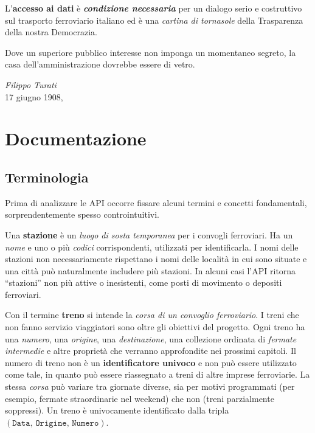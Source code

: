 \documentclass[12pt,italian]{report}
\begin{document}
L'\textbf{accesso ai dati} è \textit{\textbf{condizione necessaria}}
per un dialogo serio e costruttivo sul trasporto ferroviario italiano
ed è una \textit{cartina di tornasole} della Trasparenza della nostra
Democrazia.

\vfill

\epigraph{Dove un superiore pubblico interesse non imponga un
    momentaneo segreto, la casa dell'amministrazione dovrebbe essere
    di vetro.}{\textit{Filippo Turati}\\17 giugno 1908,~\cite{Turati}}


\printbibliography


\appendix

\chapter{Documentazione}
\label{documentazione}

\section{Terminologia}
\label{terminologia}

Prima di analizzare le API occorre fissare alcuni termini e concetti
fondamentali, sorprendentemente spesso controintuitivi.

Una \textbf{stazione} è un \textit{luogo di sosta temporanea} per i
convogli ferroviari.  Ha un \textit{nome} e uno o più \textit{codici}
corrispondenti, utilizzati per identificarla.  I nomi delle stazioni
non necessariamente rispettano i nomi delle località in cui sono
situate e una città può naturalmente includere più stazioni.  In
alcuni casi l'API ritorna ``stazioni'' non più attive o inesistenti,
come posti di movimento o depositi ferroviari.

Con il termine \textbf{treno} si intende la \textit{corsa di un
    convoglio ferroviario}.  I treni che non fanno servizio
viaggiatori sono oltre gli obiettivi del progetto.  Ogni treno ha una
\textit{numero}, una \textit{origine}, una \textit{destinazione}, una
collezione ordinata di \textit{fermate intermedie} e altre proprietà
che verranno approfondite nei prossimi capitoli.  Il numero di treno
non è un \textbf{identificatore univoco} e non può essere utilizzato
come tale, in quanto può essere riassegnato a treni di altre imprese
ferroviarie.  La stessa \textit{corsa} può variare tra giornate
diverse, sia per motivi programmati (per esempio, fermate
straordinarie nel weekend) che non (treni parzialmente soppressi).  Un
treno è univocamente identificato dalla tripla
$(\texttt{Data}, \, \texttt{Origine}, \, \texttt{Numero})$.
\end{document}
